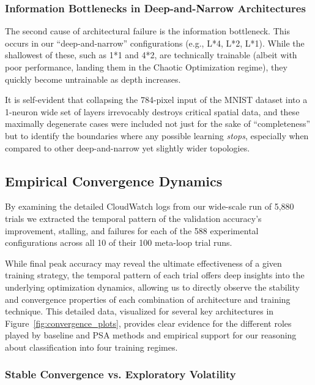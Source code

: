 \documentclass[conference]{IEEEtran}
\begin{document}
\subsubsection{Information Bottlenecks in Deep-and-Narrow Architectures}

The second cause of architectural failure is the information bottleneck. This occurs in our ``deep-and-narrow'' configurations (e.g., L*4, L*2, L*1). While the shallowest of these, such as 1*1 and 4*2, are technically trainable (albeit with poor performance, landing them in the Chaotic Optimization regime), they quickly become untrainable as depth increases.

It is self-evident that collapsing the 784-pixel input of the MNIST dataset into a 1-neuron wide set of layers irrevocably destroys critical spatial data, and these maximally degenerate cases were included not just for the sake of ``completeness'' but to identify the boundaries where any possible learning \textit{stops}, especially when compared to other deep-and-narrow yet slightly wider topologies.

\subsection{Empirical Convergence Dynamics}

By examining the detailed CloudWatch logs from our wide-scale run of 5,880 trials we extracted the temporal pattern of the validation accuracy's improvement, stalling, and failures for each of the 588 experimental configurations across all 10 of their 100 meta-loop trial runs.

While final peak accuracy may reveal the ultimate effectiveness of a given training strategy, the temporal pattern of each trial offers deep insights into the underlying optimization dynamics, allowing us to directly observe the stability and convergence properties of each combination of architecture and training technique. This detailed data, visualized for several key architectures in Figure~\ref{fig:convergence_plots}, provides clear evidence for the different roles played by baseline and PSA methods and empirical support for our reasoning about classification into four training regimes.

\subsubsection{Stable Convergence vs. Exploratory Volatility}
\end{document}
